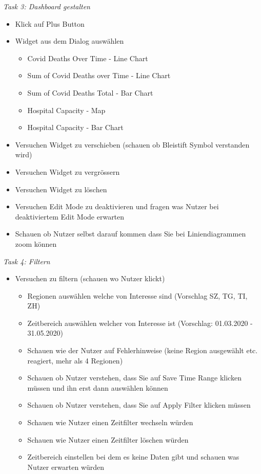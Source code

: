 \documentclass[12pt, oneside]{article}
\begin{document}
\textit{Task 3: Dashboard gestalten}
\begin{itemize}
    \item Klick auf Plus Button
    \item Widget aus dem Dialog auswählen
    \begin{itemize}
        \item Covid Deaths Over Time - Line Chart
        \item Sum of Covid Deaths over Time - Line Chart
        \item Sum of Covid Deaths Total - Bar Chart
        \item Hospital Capacity - Map
        \item Hospital Capacity - Bar Chart
    \end{itemize}
    \item Versuchen Widget zu verschieben (schauen ob Bleistift Symbol verstanden wird)
    \item Versuchen Widget zu vergrössern
    \item Versuchen Widget zu löschen
    \item Versuchen Edit Mode zu deaktivieren und fragen was Nutzer bei deaktiviertem Edit Mode erwarten
    \item Schauen ob Nutzer selbst darauf kommen dass Sie bei Liniendiagrammen zoom können
\end{itemize}

\textit{Task 4: Filtern}
\begin{itemize}
\item Versuchen zu filtern (schauen wo Nutzer klickt)
    \begin{itemize}
        \item Regionen auswählen welche von Interesse sind (Vorschlag SZ, TG, TI, ZH)
        \item Zeitbereich auswählen welcher von Interesse ist (Vorschlag: 01.03.2020 - 31.05.2020)
        \item Schauen wie der Nutzer auf Fehlerhinweise (keine Region ausgewählt etc. reagiert, mehr als 4 Regionen)
        \item Schauen ob Nutzer verstehen, dass Sie auf Save Time Range klicken müssen und ihn erst dann auswählen können
        \item Schauen ob Nutzer verstehen, dass Sie auf Apply Filter klicken müssen
        \item Schauen wie Nutzer einen Zeitfilter wechseln würden
        \item Schauen wie Nutzer einen Zeitfilter löschen würden
        \item Zeitbereich einstellen bei dem es keine Daten gibt und schauen was Nutzer erwarten würden
    \end{itemize}
\end{itemize}
\end{document}
